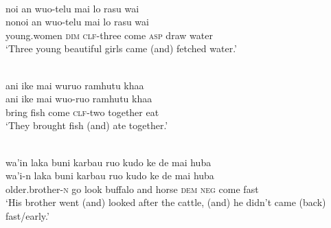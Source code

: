 \ea\label{WMH_Julio_goat099_2}
\\
\glll noi an wuo-telu mai lo rasu wai \\
nonoi an wuo-telu mai lo rasu wai \\
young.women \textsc{dim} \textsc{clf}-three come \textsc{asp} draw water\\
\glft `Three young beautiful girls came (and) fetched water.' \\ 
\z

\ea \label{WMH_Julio_goat049_2}
\\
\glll ani ike mai wuruo ramhutu khaa \\
ani ike mai wuo-ruo ramhutu khaa \\
bring fish come \textsc{clf}-two together eat\\
\glft `They brought fish (and) ate together.' \\
\z

\ea \label{WMH_Julio_goat057_3}
\\
\glll wa'in laka buni karbau ruo kudo ke de mai huba \\
wa'i-n laka buni karbau ruo kudo ke de mai huba \\
older.brother-\textsc{n} go look buffalo and horse \textsc{dem} \textsc{neg} come fast\\
\glft `His brother went (and) looked after the cattle, (and) he didn't came (back) fast/early.' \\
\z

